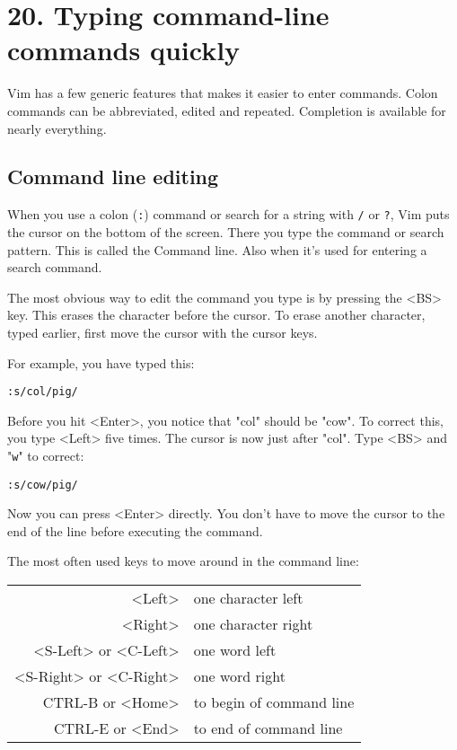 \section{20. Typing command-line commands quickly}
Vim has a few generic features that makes it easier to enter commands.  Colon
commands can be abbreviated, edited and repeated.  Completion is available for
nearly everything.
\subsection{Command line editing}
When you use a colon (\texttt{:}) command or search for a string with \texttt{/} or \texttt{?}, Vim puts the cursor on the bottom of the screen.
There you type the command or search pattern.
This is called the Command line.
Also when it's used for entering a search command.

The most obvious way to edit the command you type is by pressing the <BS> key.
This erases the character before the cursor.
To erase another character, typed earlier, first move the cursor with the cursor keys.

For example, you have typed this:

\begin{Verbatim}[samepage=true]
 :s/col/pig/
\end{Verbatim}

Before you hit <Enter>, you notice that "col" should be "cow".
To correct this, you type <Left> five times.
The cursor is now just after "col".
Type <BS> and "\texttt{w}" to correct:

\begin{Verbatim}[samepage=true]
 :s/cow/pig/
\end{Verbatim}

Now you can press <Enter> directly.
You don't have to move the cursor to the end of the line before executing the command.

The most often used keys to move around in the command line:

\begin{center} \begin{longtable}{r l}
				<Left> & one character left \\
				<Right> & one character right\\
				<S-Left> or <C-Left> & one word left\\
				<S-Right> or <C-Right> & one word right\\
				CTRL-B or <Home> & to begin of command line\\
				CTRL-E or <End> & to end of command line\\
\end{longtable} \end{center}

